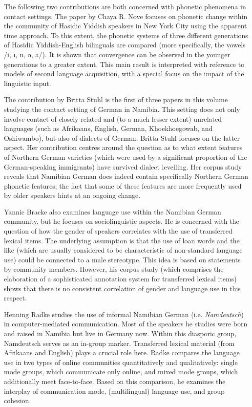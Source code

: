 \documentclass[output=paper]{langsci/langscibook}
\begin{document}
The following two contributions are both concerned with phonetic phenomena in contact settings. The paper by {Chaya} {R.} {Nove} focuses on phonetic change within the community of Hasidic Yiddish speakers in New York City using the apparent time approach. To this extent, the phonetic systems of three different generations of Hasidic Yiddish-English bilinguals are compared (more specifically, the vowels /i, ɪ, u, ʊ, a/). It is shown that convergence can be observed in the younger generations to a greater extent. This main result is interpreted with reference to models of second language acquisition, with a special focus on the impact of the linguistic input.

The contribution by {Britta} {Stuhl} is the first of three papers in this volume studying the contact setting of German in Namibia. This setting does not only involve contact of closely related and (to a much lesser extent) unrelated languages (such as Afrikaans, English, German, Khoekhoegowab, and Oshiwambo), but also of dialects of German. Britta Stuhl focuses on the latter aspect. Her contribution centres around the question as to what extent features of Northern German varieties (which were used by a significant proportion of the German-speaking immigrants) have survived dialect levelling. Her corpus study reveals that Namibian German does indeed contain specifically Northern German phonetic features; the fact that some of these features are more frequently used by older speakers hints at an ongoing change. 

{Yannic} {Bracke} also examines language use within the Namibian German community, but he focuses on sociolinguistic aspects. He is concerned with the question of how the gender of speakers correlates with the use of transferred lexical items. The underlying assumption is that the use of loan words and the like (which are usually considered to be characteristic of non-standard language use) could be connected to a male stereotype. This idea is based on statements by community members. However, his corpus study (which comprises the elaboration of a sophisticated annotation system for transferred lexical items) shows that there is no consistent correlation of gender and language use in this respect. 

{Henning} {Radke} studies the use of informal Namibian German (i.e. \textit{Namdeutsch}) in computer-mediated communication. Most of the speakers he studies were born and raised in Namibia but live in Germany now. Within this diasporic group, Namdeutsch serves as an in-group marker. Transferred lexical material (from Afrikaans and English) plays a crucial role here. Radke compares the language use in two types of online communities quantitatively and qualitatively: single mode groups, which communicate only online, and mixed mode groups, which additionally meet face-to-face. Based on this comparison, he examines the interplay of communication mode, (multilingual) language use, and group cohesion.
\end{document}
